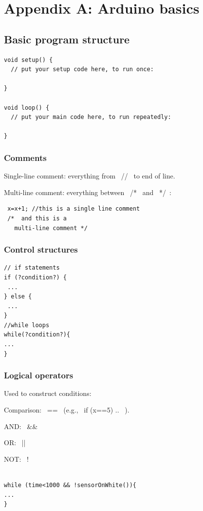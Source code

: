 \documentclass[oneside]{stml-l}
\numberwithin{figure}{chapter}
\begin{document}
\chapter{Appendix A: Arduino basics}\label{c:arduino}
\section{Basic program structure}
\par\noindent
\begin{lstlisting}
void setup() {
  // put your setup code here, to run once:

}

void loop() {
  // put your main code here, to run repeatedly:

}
\end{lstlisting}

\subsection*{Comments}
Single-line comment: everything from ~//~ to end of line.

Multi-line comment: everything between ~/*~ and ~*/~:
\begin{lstlisting}
 x=x+1; //this is a single line comment
 /*  and this is a
   multi-line comment */

\end{lstlisting}

\subsection*{Control structures}
\par\noindent
\begin{lstlisting}
// if statements
if (?condition?) {
 ...
} else {
 ...
}
//while loops
while(?condition?){
...
}
\end{lstlisting}

\subsection*{Logical operators}
Used to construct conditions:

Comparison: ~==~ (e.g., ~if (x==5) {.. }~).


AND: ~&&~

OR: ~||~

NOT: ~!~

\begin{lstlisting}

while (time<1000 && !sensorOnWhite()){
...
}

\end{lstlisting}
\end{document}
